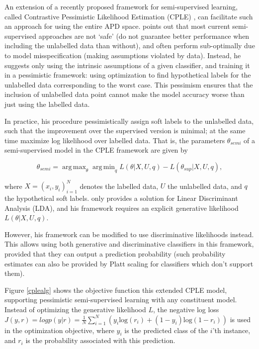 \documentclass[12pt,PhD,twoside]{muthesis}
\DeclareMathOperator*{\argmin}{arg\,min}
\DeclareMathOperator*{\argmax}{arg\,max}
\begin{document}
An extension of a recently proposed framework for semi-supervised learning, called Contrastive Pessimistic Likelihood Estimation (CPLE) \citep{loog2015contrastive}, can facilitate such an approach for using the entire APD space. \cite{loog2015contrastive} points out that most current semi-supervised approaches are not `safe' (do not guarantee better performance when including the unlabelled data than without), and often perform sub-optimally due to model misspecification (making assumptions violated by data). Instead, he suggests only using the intrinsic assumptions of a given classifier, and training it in a pessimistic framework: using optimization to find hypothetical labels for the unlabelled data corresponding to the worst case. This pessimism ensures that the inclusion of unlabelled data point cannot make the model accuracy worse than just using the labelled data. 

In practice, his procedure pessimistically assign soft labels to the unlabelled data, such that the improvement over the supervised version is minimal; at the same time maximize log likelihood over labelled data. That is, the parameters $\theta_{semi}$ of a semi-supervised model in the CPLE framework are given by

\begin{equation}
\label{eq:cple}
\theta_{semi} = \argmax_\theta \argmin_q L(\theta|X,U,q) - L(\theta_{sup}|X,U,q),
\end{equation}

where $X={(x_i,y_i)}_{i=1}^N$ denotes the labelled data, $U$ the unlabelled data, and $q$ the hypothetical soft labels. \citep{loog2015contrastive} only provides a solution for Linear Discriminant Analysis (LDA), and his framework requires an explicit generative likelihood $L(\theta|X,U,q)$.

However, his framework can be modified to use discriminative likelihoods instead. This allows using both generative and discriminative classifiers in this framework, provided that they can output a prediction probability (such probability estimates can also be provided by Platt scaling \citep{platt1999probabilistic} for classifiers which don't support them). 

Figure \ref{cplealg} shows the objective function this extended CPLE model, supporting pessimistic semi-supervised learning with any constituent model. Instead of optimizing the generative likelihood $L$, the negative log loss $J(y,r)=log p(y|r)=\frac{1}{N} \sum_{i=1}^N (y_i \text{log} (r_i) + (1-y_i) \text{log} (1-r_i))$ is used in the optimization objective, where $y_i$ is the predicted class of the $i$'th instance, and $r_i$ is the probability associated with this prediction.
\end{document}
